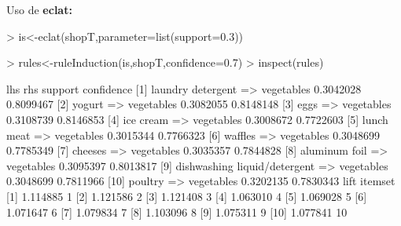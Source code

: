 \documentclass [a4paper] {article}
\begin{document}
{\bigskip
Uso de \textbf{eclat:}
\begin{Schunk}
\begin{Sinput}
> is<-eclat(shopT,parameter=list(support=0.3))
\end{Sinput}
\end{Schunk}

\begin{Schunk}
\begin{Sinput}
> rules<-ruleInduction(is,shopT,confidence=0.7)
> inspect(rules)
\end{Sinput}
\begin{Soutput}
     lhs                               rhs          support   confidence
[1]  {laundry detergent}            => {vegetables} 0.3042028 0.8099467 
[2]  {yogurt}                       => {vegetables} 0.3082055 0.8148148 
[3]  {eggs}                         => {vegetables} 0.3108739 0.8146853 
[4]  {ice cream}                    => {vegetables} 0.3008672 0.7722603 
[5]  {lunch meat}                   => {vegetables} 0.3015344 0.7766323 
[6]  {waffles}                      => {vegetables} 0.3048699 0.7785349 
[7]  {cheeses}                      => {vegetables} 0.3035357 0.7844828 
[8]  {aluminum foil}                => {vegetables} 0.3095397 0.8013817 
[9]  {dishwashing liquid/detergent} => {vegetables} 0.3048699 0.7811966 
[10] {poultry}                      => {vegetables} 0.3202135 0.7830343 
     lift     itemset
[1]  1.114885  1     
[2]  1.121586  2     
[3]  1.121408  3     
[4]  1.063010  4     
[5]  1.069028  5     
[6]  1.071647  6     
[7]  1.079834  7     
[8]  1.103096  8     
[9]  1.075311  9     
[10] 1.077841 10     
\end{Soutput}
\end{Schunk}

}
\end{document}
